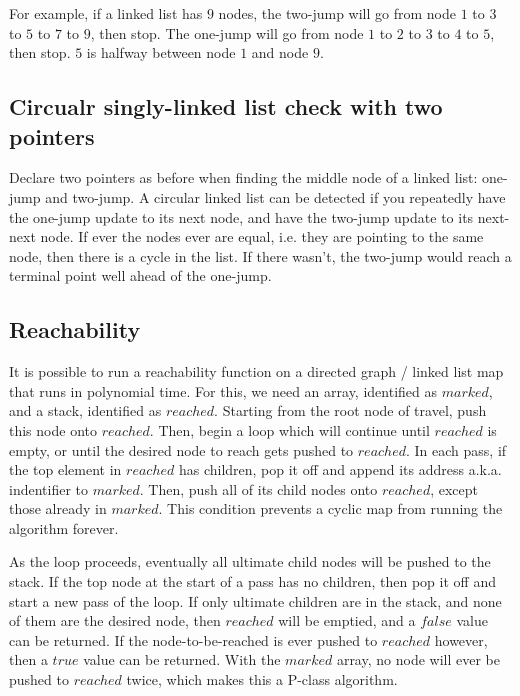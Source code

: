 \documentclass[12pt]{article}
\begin{document}
	For example, if a linked list has $9$ nodes, the two-jump will go from node $1$ to $3$ to $5$ to $7$ to $9$, then stop. The one-jump will go from node $1$ to $2$ to $3$ to $4$ to $5$, then stop. $5$ is halfway between node $1$ and node $9$.

	\subsection{Circualr singly-linked list check with two pointers}
	Declare two pointers as before when finding the middle node of a linked list: one-jump and two-jump. A circular linked list can be detected if you repeatedly have the one-jump update to its next node, and have the two-jump update to its next-next node. If ever the nodes ever are equal, i.e. they are pointing to the same node, then there is a cycle in the list. If there wasn't, the two-jump would reach a terminal point well ahead of the one-jump.

	\subsection{Reachability}
	It is possible to run a reachability function on a directed graph / linked list map that runs in polynomial time. For this, we need an array, identified as $marked$, and a stack, identified as $reached$. Starting from the root node of travel, push this node onto $reached$. Then, begin a loop which will continue until $reached$ is empty, or until the desired node to reach gets pushed to $reached$. In each pass, if the top element in $reached$ has children, pop it off and append its address a.k.a. indentifier to $marked$. Then, push all of its child nodes onto $reached$, except those already in $marked$. This condition prevents a cyclic map from running the algorithm forever. \linebreak

	As the loop proceeds, eventually all ultimate child nodes will be pushed to the stack. If the top node at the start of a pass has no children, then pop it off and start a new pass of the loop. If only ultimate children are in the stack, and none of them are the desired node, then $reached$ will be emptied, and a $false$ value can be returned. If the node-to-be-reached is ever pushed to $reached$ however, then a $true$ value can be returned. With the $marked$ array, no node will ever be pushed to $reached$ twice, which makes this a P-class algorithm.
\end{document}
